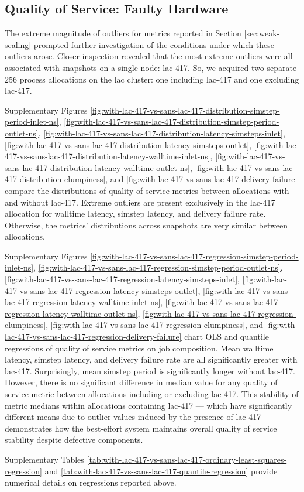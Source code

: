 \subsection{Quality of Service: Faulty Hardware}

The extreme magnitude of outliers for metrics reported in Section \ref{sec:weak-scaling} prompted further investigation of the conditions under which these outliers arose.
Closer inspection revealed that the most extreme outliers were all associated with snapshots on a single node: lac-417.
So, we acquired two separate 256 process allocations on the lac cluster: one including lac-417 and one excluding lac-417.

Supplementary Figures \ref{fig:with-lac-417-vs-sans-lac-417-distribution-simstep-period-inlet-ns}, \ref{fig:with-lac-417-vs-sans-lac-417-distribution-simstep-period-outlet-ns}, \ref{fig:with-lac-417-vs-sans-lac-417-distribution-latency-simsteps-inlet}, \ref{fig:with-lac-417-vs-sans-lac-417-distribution-latency-simsteps-outlet}, \ref{fig:with-lac-417-vs-sans-lac-417-distribution-latency-walltime-inlet-ns}, \ref{fig:with-lac-417-vs-sans-lac-417-distribution-latency-walltime-outlet-ns}, \ref{fig:with-lac-417-vs-sans-lac-417-distribution-clumpiness}, and \ref{fig:with-lac-417-vs-sans-lac-417-delivery-failure} compare the distributions of quality of service metrics between allocations with and without lac-417.
Extreme outliers are present exclusively in the lac-417 allocation for walltime latency, simstep latency, and delivery failure rate.
Otherwise, the metrics' distributions across snapshots are very similar between allocations.

Supplementary Figures \ref{fig:with-lac-417-vs-sans-lac-417-regression-simstep-period-inlet-ns}, \ref{fig:with-lac-417-vs-sans-lac-417-regression-simstep-period-outlet-ns}, \ref{fig:with-lac-417-vs-sans-lac-417-regression-latency-simsteps-inlet}, \ref{fig:with-lac-417-vs-sans-lac-417-regression-latency-simsteps-outlet}, \ref{fig:with-lac-417-vs-sans-lac-417-regression-latency-walltime-inlet-ns}, \ref{fig:with-lac-417-vs-sans-lac-417-regression-latency-walltime-outlet-ns}, \ref{fig:with-lac-417-vs-sans-lac-417-regression-clumpiness}, \ref{fig:with-lac-417-vs-sans-lac-417-regression-clumpiness}, and
\ref{fig:with-lac-417-vs-sans-lac-417-regression-delivery-failure} chart OLS and quantile regressions of quality of service metrics on job composition.
Mean walltime latency, simstep latency, and delivery failure rate are all significantly greater with lac-417.
Surprisingly, mean simstep period is significantly longer without lac-417.
However, there is no significant difference in median value for any quality of service metric between allocations including or excluding lac-417.
This stability of metric medians within allocations containing lac-417 --- which have significantly different means due to outlier values induced by the presence of lac-417 --- demonstrates how the best-effort system maintains overall quality of service stability despite defective components.

Supplementary Tables \ref{tab:with-lac-417-vs-sans-lac-417-ordinary-least-squares-regression} and \ref{tab:with-lac-417-vs-sans-lac-417-quantile-regression} provide numerical details on regressions reported above.
